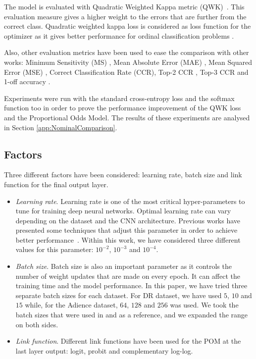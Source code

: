 \documentclass[journal]{IEEEtran}
\begin{document}
	The model is evaluated with Quadratic Weighted Kappa metric (QWK)~\cite{ben2008comparison}. This evaluation measure gives a higher weight to the errors that are further from the correct class. Quadratic weighted kappa loss is considered as loss function for the optimizer as it gives better performance for ordinal classification problems \cite{de2018weighted}.
	
	Also, other evaluation metrics have been used to ease the comparison with other works: Minimum Sensitivity (MS) \cite{cruz2014metrics}, Mean Absolute Error (MAE) \cite{cruz2014metrics}, Mean Squared Error (MSE) \cite{wang2009mean}, Correct Classification Rate (CCR), Top-2 CCR \cite{beckham2017unimodal}, Top-3 CCR \cite{beckham2017unimodal} and 1-off accuracy \cite{chen2016cascaded,levi2015age,eidinger2014age}.
	
	Experiments were run with the standard cross-entropy loss and the softmax function too in order to prove the performance improvement of the QWK loss and the Proportional Odds Model. The results of these experiments are analysed in Section \ref{app:NominalComparison}.
	
	\subsection{Factors}
	Three different factors have been considered: learning rate, batch size and link function for the final output layer.
	
	\begin{itemize}
		\item \textit{Learning rate}. Learning rate is one of the most critical hyper-parameters to tune for training deep neural networks. Optimal learning rate can vary depending on the dataset and the CNN architecture. Previous works have presented some techniques that adjust this parameter in order to achieve better performance~\cite{smith2017cyclical,senior2013empirical}. Within this work, we have considered three different values for this parameter: $10^{-2}$, $10^{-3}$ and $10^{-4}$.
		\item \textit{Batch size}. Batch size is also an important parameter as it controls the number of weight updates that are made on every epoch. It can affect the training time and the model performance. In this paper, we have tried three separate batch sizes for each dataset. For DR dataset, we have used $5$, $10$ and $15$ while, for the Adience dataset, $64$, $128$ and $256$ was used. We took the batch sizes that were used in \cite{de2018weighted} and \cite{beckham2017unimodal} as a reference, and we expanded the range on both sides.
		\item \textit{Link function}. Different link functions have been used for the POM at the last layer output: logit, probit and complementary log-log.
	\end{itemize}
	
\end{document}

